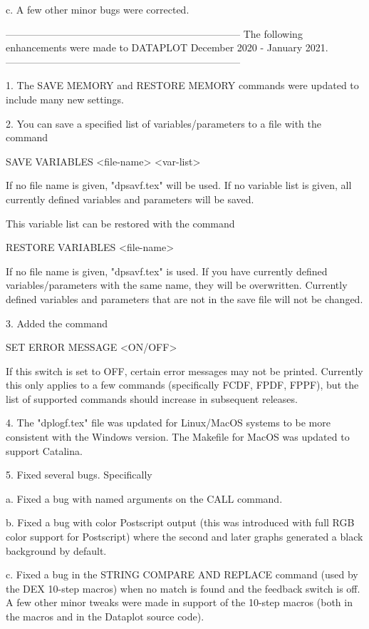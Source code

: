     c. A few other minor bugs were corrected.

-----------------------------------------------------------------------
The following enhancements were made to DATAPLOT
December 2020 - January 2021.
-----------------------------------------------------------------------

 1. The SAVE MEMORY and RESTORE MEMORY commands were updated to
    include many new settings.

 2. You can save a specified list of variables/parameters to a
    file with the command

        SAVE VARIABLES <file-name> <var-list>

    If no file name is given, "dpsavf.tex" will be used.  If
    no variable list is given, all currently defined variables
    and parameters will be saved.

    This variable list can be restored with the command

        RESTORE VARIABLES <file-name>

    If no file name is given, "dpsavf.tex" is used.  If you
    have currently defined variables/parameters with the same
    name, they will be overwritten.  Currently defined variables
    and parameters that are not in the save file will not be
    changed.

 3. Added the command

        SET ERROR MESSAGE <ON/OFF>

    If this switch is set to OFF, certain error messages may not
    be printed.  Currently this only applies to a few commands
    (specifically FCDF, FPDF, FPPF), but the list of supported commands
    should increase in subsequent releases.

 4. The "dplogf.tex" file was updated for Linux/MacOS systems to be more
    consistent with the Windows version.  The Makefile for MacOS was
    updated to support Catalina.

 5. Fixed several bugs.  Specifically

    a. Fixed a bug with named arguments on the CALL command.

    b. Fixed a bug with color Postscript output (this was introduced
       with full RGB color support for Postscript) where the second
       and later graphs generated a black background by default.

    c. Fixed a bug in the STRING COMPARE AND REPLACE command (used
       by the DEX 10-step macros) when no match is found and the
       feedback switch is off.  A few other minor tweaks were made
       in support of the 10-step macros (both in the macros and in
       the Dataplot source code).

